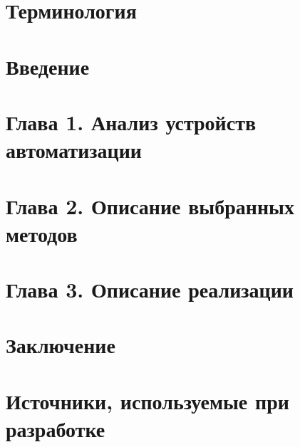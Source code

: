 \documentclass[
encoding=utf8
]{./twoeskd}
\newcommand{\+}{\discretionary{\mbox{\scriptsize$\hookleftarrow$}}{}{}}
\begin{document}



\newpage
{}
\tableofcontents

\setcounter{secnumdepth}{0}

\newpage
\section{Терминология}


\newpage
\section{Введение}


\setcounter{secnumdepth}{3}

\newpage
\section{Глава 1. Анализ устройств автоматизации}


\newpage
\section{Глава 2. Описание выбранных методов}


\newpage
\section{Глава 3. Описание реализации}


\newpage
\section{Заключение}


\newpage
\section{Источники, используемые при разработке}


\newpage

\eskdListOfChanges

\end{document}
